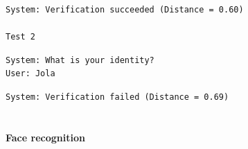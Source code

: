 \documentclass[11pt]{article}
\begin{document}
    \begin{Verbatim}[commandchars=\\\{\}]
System: Verification succeeded (Distance = 0.60)

Test 2
    \end{Verbatim}

    \begin{Verbatim}[commandchars=\\\{\}]
System: What is your identity?
User: Jola
    \end{Verbatim}

    \begin{Verbatim}[commandchars=\\\{\}]
System: Verification failed (Distance = 0.69)


    \end{Verbatim}

    \hypertarget{face-recognition}{%
\paragraph{Face recognition}\label{face-recognition}}
\end{document}
